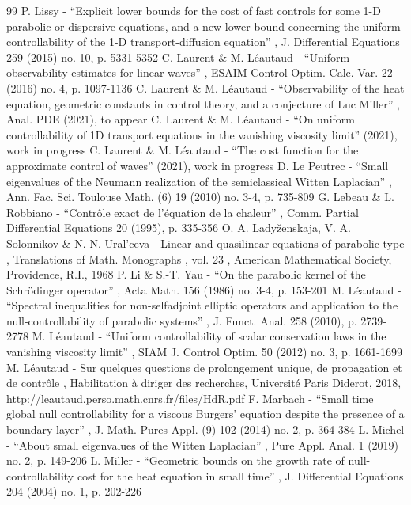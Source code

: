 \documentclass[11pt]{article}
\numberwithin{equation}{section}
\begin{document}
\begin{thebibliography}{99}
 P. Lissy - “Explicit lower bounds for the cost of fast controls for some 1-D parabolic or dispersive equations, and a new lower bound concerning the uniform controllability of the 1-D transport-diffusion equation” , J. Differential Equations 259 (2015) no. 10, p. 5331-5352
 C. Laurent \& M. Léautaud - “Uniform observability estimates for linear waves” , ESAIM Control Optim. Calc. Var. 22 (2016) no. 4, p. 1097-1136
 C. Laurent \& M. Léautaud - “Observability of the heat equation, geometric constants in control theory, and a conjecture of Luc Miller” , Anal. PDE (2021), to appear
 C. Laurent \& M. Léautaud - “On uniform controllability of 1D transport equations in the vanishing viscosity limit” (2021), work in progress
 C. Laurent \& M. Léautaud - “The cost function for the approximate control of waves” (2021), work in progress
 D. Le Peutrec - “Small eigenvalues of the Neumann realization of the semiclassical Witten Laplacian” , Ann. Fac. Sci. Toulouse Math. (6) 19 (2010) no. 3-4, p. 735-809
 G. Lebeau \& L. Robbiano - “Contrôle exact de l’équation de la chaleur” , Comm. Partial Differential Equations 20 (1995), p. 335-356
 O. A. Ladyženskaja, V. A. Solonnikov \& N. N. Ural’ceva - Linear and quasilinear equations of parabolic type , Translations of Math. Monographs , vol. 23 , American Mathematical Society, Providence, R.I., 1968
 P. Li \& S.-T. Yau - “On the parabolic kernel of the Schrödinger operator” , Acta Math. 156 (1986) no. 3-4, p. 153-201
 M. Léautaud - “Spectral inequalities for non-selfadjoint elliptic operators and application to the null-controllability of parabolic systems” , J. Funct. Anal. 258 (2010), p. 2739-2778
 M. Léautaud - “Uniform controllability of scalar conservation laws in the vanishing viscosity limit” , SIAM J. Control Optim. 50 (2012) no. 3, p. 1661-1699
 M. Léautaud - Sur quelques questions de prolongement unique, de propagation et de contrôle , Habilitation à diriger des recherches, Université Paris Diderot, 2018, http://leautaud.perso.math.cnrs.fr/files/HdR.pdf
 F. Marbach - “Small time global null controllability for a viscous Burgers’ equation despite the presence of a boundary layer” , J. Math. Pures Appl. (9) 102 (2014) no. 2, p. 364-384
 L. Michel - “About small eigenvalues of the Witten Laplacian” , Pure Appl. Anal. 1 (2019) no. 2, p. 149-206
 L. Miller - “Geometric bounds on the growth rate of null-controllability cost for the heat equation in small time” , J. Differential Equations 204 (2004) no. 1, p. 202-226

\end{thebibliography}
\end{document}

